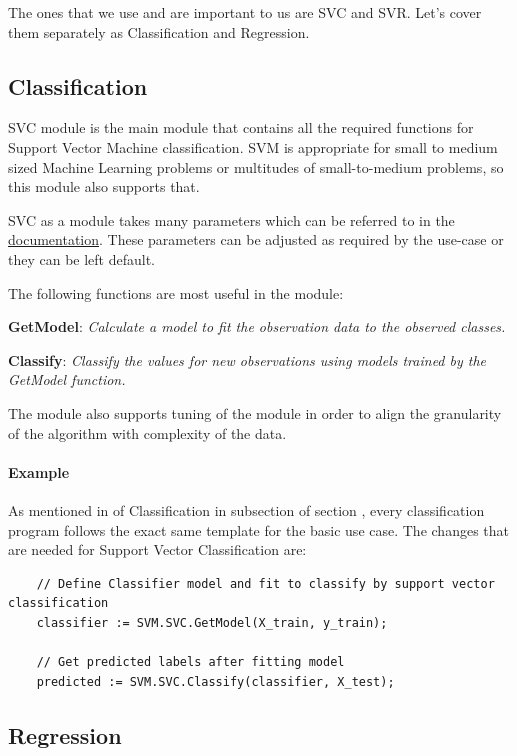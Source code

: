 \documentclass[a4paper,oneside,12pt]{book}
\begin{document}
The ones that we use and are important to us are SVC and SVR. Let's cover them separately as Classification and Regression.

\subsection{Classification}

SVC module is the main module that contains all the required functions for Support Vector Machine classification. SVM is appropriate for small to medium sized Machine Learning problems or multitudes of small-to-medium problems, so this module also supports that. 

SVC as a module takes many parameters which can be referred to in the \href{https://cdn.hpccsystems.com/pdf/ml/SupportVectorMachines.pdf}{documentation}. These parameters can be adjusted as required by the use-case or they can be left default. 

The following functions are most useful in the module:

\textbf{GetModel}: \textit{Calculate a model to fit the observation data to the observed classes.}

\textbf{Classify}: \textit{Classify the values for new observations using models trained by the GetModel function.}

The module also supports tuning of the module in order to align the granularity of the algorithm with complexity of the data.

\paragraph{Example}

As mentioned in  of Classification in  subsection of section , every classification program follows the exact same template for the basic use case. The changes that are needed for Support Vector Classification are:

\begin{lstlisting}
    // Define Classifier model and fit to classify by support vector classification
    classifier := SVM.SVC.GetModel(X_train, y_train);

    // Get predicted labels after fitting model
    predicted := SVM.SVC.Classify(classifier, X_test);
\end{lstlisting}

\subsection{Regression}
\end{document}
